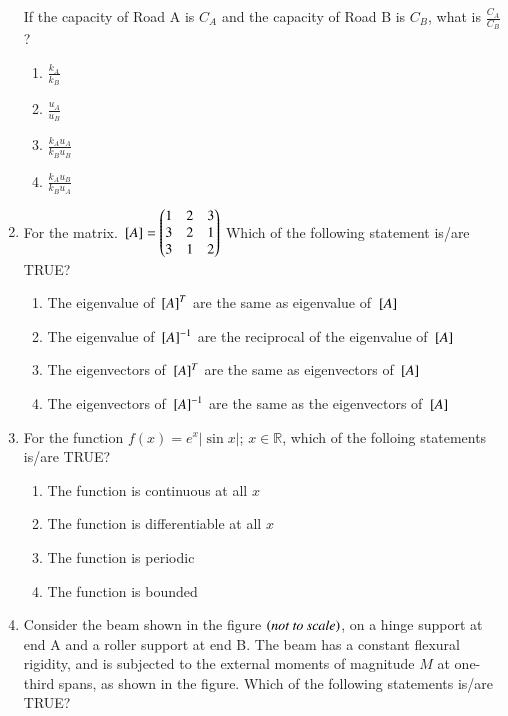 \documentclass[journal,12pt,onecolumn]{IEEEtran}
\theoremstyle{remark}
\begin{document}
\begin{enumerate}
If the capacity of Road A is $C_A$ and the capacity of Road B is $C_B$, what is $\frac{C_A}{C_B}$?

\hfill{}
\begin{enumerate}
\item $\frac{k_A}{k_B}$
\item $\frac{u_A}{u_B}$
\item $\frac{k_Au_A}{k_Bu_B}$
\item $\frac{k_Au_B}{k_Bu_A}$
\end{enumerate}

\item For the matrix.
${}\left[A\right] = \begin{pmatrix}
1 & 2 & 3 \\
3 & 2 & 1 \\
3 & 1 & 2
\end{pmatrix}$
Which of the following statement is/are TRUE?

\hfill{}
\begin{enumerate}
\item The eigenvalue of ${}\left[A\right]^T$ are the same as eigenvalue of  ${}\left[A\right]$
\item The eigenvalue of ${}\left[A\right]^{-1}$ are the reciprocal of the eigenvalue of  ${}\left[A\right]$
\item The eigenvectors of ${}\left[A\right]^T$ are the same as eigenvectors of  ${}\left[A\right]$
\item The eigenvectors of ${}\left[A\right]^{-1}$ are the same as the eigenvectors of  ${}\left[A\right]$
\end{enumerate}

\item For the function $f(x)=e^x|\sin{x}|$; $x\in\mathbb{R}$, which of the folloing statements is/are TRUE?

\hfill{}
\begin{enumerate}
\item The function is continuous at all $x$
\item The function is differentiable at all $x$
\item The function is periodic
\item The function is bounded
\end{enumerate}

\item Consider the beam shown in the figure $\left(\textit{not to scale}\right)$, on a hinge support at end A and a roller support at end B. The beam has a constant flexural rigidity, and is subjected to the external moments of magnitude $M$ at one-third spans, as shown in the figure. Which of the following statements is/are TRUE?


\end{enumerate}
\end{document}
